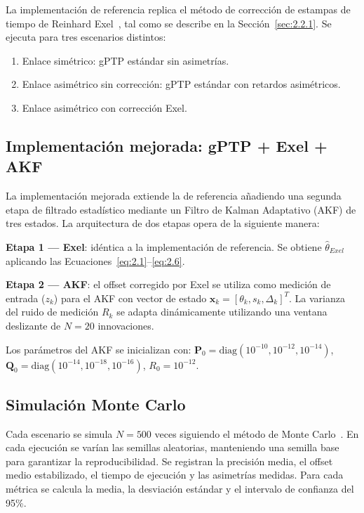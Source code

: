 La implementación de referencia replica el método de corrección de estampas de tiempo de Reinhard Exel~\cite{exel2014}, tal como se describe en la Sección~\ref{sec:2.2.1}. Se ejecuta para tres escenarios distintos:
\begin{enumerate}
\item Enlace simétrico: gPTP estándar sin asimetrías.
\item Enlace asimétrico sin corrección: gPTP estándar con retardos asimétricos.
\item Enlace asimétrico con corrección Exel.
\end{enumerate}

\subsection{Implementación mejorada: gPTP + Exel + AKF}
\label{sec:3.1.3}

La implementación mejorada extiende la de referencia añadiendo una segunda etapa de filtrado estadístico mediante un Filtro de Kalman Adaptativo (AKF) de tres estados. La arquitectura de dos etapas opera de la siguiente manera:

\textbf{Etapa 1 --- Exel}: idéntica a la implementación de referencia. Se obtiene $\hat{\theta}_{Exel}$ aplicando las Ecuaciones~\ref{eq:2.1}--\ref{eq:2.6}.

\textbf{Etapa 2 --- AKF}: el offset corregido por Exel se utiliza como medición de entrada ($z_k$) para el AKF con vector de estado $\mathbf{x}_k = [\theta_k, s_k, \Delta_k]^T$. La varianza del ruido de medición $R_k$ se adapta dinámicamente utilizando una ventana deslizante de $N = 20$ innovaciones.

Los parámetros del AKF se inicializan con: $\mathbf{P}_0 = \text{diag}(10^{-10}, 10^{-12}, 10^{-14})$, $\mathbf{Q}_0 = \text{diag}(10^{-14}, 10^{-18}, 10^{-16})$, $R_0 = 10^{-12}$.

\subsection{Simulación Monte Carlo}
\label{sec:3.1.4}

Cada escenario se simula $N = 500$ veces siguiendo el método de Monte Carlo~\cite{luengo2020}. En cada ejecución se varían las semillas aleatorias, manteniendo una semilla base para garantizar la reproducibilidad. Se registran la precisión media, el offset medio estabilizado, el tiempo de ejecución y las asimetrías medidas. Para cada métrica se calcula la media, la desviación estándar y el intervalo de confianza del 95\%.

